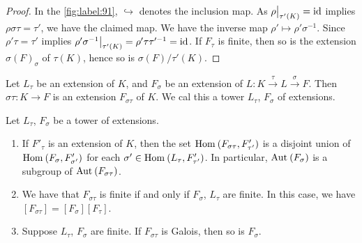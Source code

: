 \begin{proof}
  In the \autoref{fig:label:91}, $\hookrightarrow$ denotes the inclusion map. As $\restr{\rho}{\tau'(K)} = \text{id}$ implies $\rho\sigma\tau = \tau'$, we have the claimed map. We have the inverse map $\rho' \mapsto \rho'\sigma^{-1}$. Since $\rho'\tau = \tau'$ implies $\restr{\rho'\sigma^{-1}}{\tau'(K)} = \rho'\tau\tau'^{-1} = \text{id}$. If $F_\tau$ is finite, then so is the extension $\sigma(F)_\sigma$ of $\tau(K)$, hence so is $\sigma(F)/\tau'(K)$.
\end{proof}

\begin{definition}
  \label{def:92}
  Let $L_\tau$ be an extension of $K$, and $F_\sigma$ be an extension of $L : K \stackrel{\tau}{\rightarrow} L \stackrel{\sigma}{\rightarrow} F$. Then $\sigma\tau : K \rightarrow F$ is an extension $F_{\sigma\tau}$ of $K$. We cal this a tower $L_\tau$, $F_\sigma$ of extensions.
\end{definition}

\begin{proposition}
  \label{prop:93}
  Let $L_\tau$, $F_\sigma$ be a tower of extensions.
  \begin{enumerate}
  \item If $F'_\tau$ is an extension of $K$, then the set $\homset[]{F_{\sigma\tau}}{F'_{\tau'}}$ is a disjoint union of $\homset[]{F_\sigma}{F'_{\sigma'}}$ for each $\sigma' \in \homset[]{L_\tau}{F'_{\tau'}}$. In particular, $\autset[]{F_\sigma}$ is a subgroup of $\autset[]{F_{\sigma\tau}}$.
    \begin{figure}[H]
      \centering
    \end{figure}
  \item We have that $F_{\sigma\tau}$ is finite if and only if $F_\sigma$, $L_\tau$ are finite. In this case, we have $[F_{\sigma\tau}] = [F_\sigma][F_\tau]$.
  \item Suppose $L_\tau$, $F_\sigma$ are finite. If $F_{\sigma\tau}$ is Galois, then so is $F_\sigma$.
  \end{enumerate}
\end{proposition}

